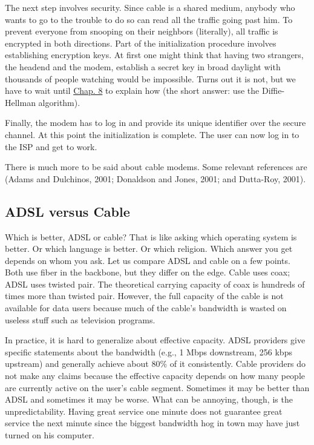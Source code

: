 The next step involves security. Since cable is a shared medium, anybody
who wants to go to the trouble to do so can read all the traffic going
past him. To prevent everyone from snooping on their neighbors
(literally), all traffic is encrypted in both directions. Part of the
initialization procedure involves establishing encryption keys. At first
one might think that having two strangers, the headend and the modem,
establish a secret key in broad daylight with thousands of people
watching would be impossible. Turns out it is not, but we have to wait
until \protect\hyperlink{0130661023_ch08.htmlux5cux23ch08}{Chap. 8} to
explain how (the short answer: use the Diffie-Hellman algorithm).

Finally, the modem has to log in and provide its unique identifier over
the secure channel. At this point the initialization is complete. The
user can now log in to the ISP and get to work.

There is much more to be said about cable modems. Some relevant
references are (Adams and Dulchinos, 2001; Donaldson and Jones, 2001;
and Dutta-Roy, 2001).

\protect\hypertarget{0130661023_ch02lev1sec7.htmlux5cux23ch02lev2sec29}{}{}

\subsection{ADSL versus Cable}

Which is better, ADSL or cable? That is like asking which operating
system is better. Or which language is better. Or which religion. Which
answer you get depends on whom you ask. Let us compare ADSL and cable on
a few points. Both use fiber in the backbone, but they differ on the
edge. Cable uses coax; ADSL uses twisted pair. The theoretical carrying
capacity of coax is hundreds of times more than twisted pair. However,
the full capacity of the cable is not available for data users because
much of the cable's bandwidth is wasted on useless stuff such as
television programs.

In practice, it is hard to generalize about effective capacity. ADSL
providers give specific statements about the bandwidth (e.g., 1 Mbps
downstream, 256 kbps upstream) and generally achieve about 80\% of it
consistently. Cable providers do not make any claims because the
effective capacity depends on how many people are currently active on
the user's cable segment. Sometimes it may be better than ADSL and
sometimes it may be worse. What can be annoying, though, is the
unpredictability. Having great service one minute does not guarantee
great service the next minute since the biggest bandwidth hog in town
may have just turned on his computer.

